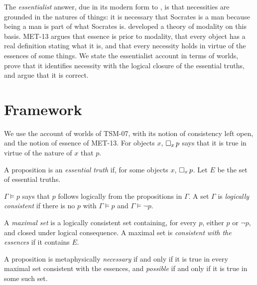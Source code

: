 \documentclass{situationist-preprint}
\begin{document}
The \emph{essentialist} answer, due in its modern form to \citet{Fine1994}, is that necessities are grounded in the natures of things: it is necessary that Socrates is a man because being a man is part of what Socrates is. \citet{Hale2013} developed a theory of modality on this basis. MET-13 argues that essence is prior to modality, that every object has a real definition stating what it is, and that every necessity holds in virtue of the essences of some things. We state the essentialist account in terms of worlds, prove that it identifies necessity with the logical closure of the essential truths, and argue that it is correct.

\section{Framework}

We use the account of worlds of TSM-07, with its notion of consistency left open, and the notion of essence of MET-13. For objects $x$, $\mathord{\Box}_x\,p$ says that it is true in virtue of the nature of $x$ that $p$.

\begin{definition}\label{d:E}
A proposition is an \emph{essential truth} if, for some objects $x$, $\mathord{\Box}_x\,p$. Let $E$ be the set of essential truths.
\end{definition}

\begin{definition}\label{d:log}
$\Gamma\vDash p$ says that $p$ follows logically from the propositions in $\Gamma$. A set $\Gamma$ is \emph{logically consistent} if there is no $p$ with $\Gamma\vDash p$ and $\Gamma\vDash\neg p$.
\end{definition}

\begin{definition}\label{d:Eworld}
A \emph{maximal set} is a logically consistent set containing, for every $p$, either $p$ or $\neg p$, and closed under logical consequence. A maximal set is \emph{consistent with the essences} if it contains $E$.
\end{definition}

\begin{principle}[Necessity]\label{p:nec}
A proposition is metaphysically \emph{necessary} if and only if it is true in every maximal set consistent with the essences, and \emph{possible} if and only if it is true in some such set.
\end{principle}
\end{document}
